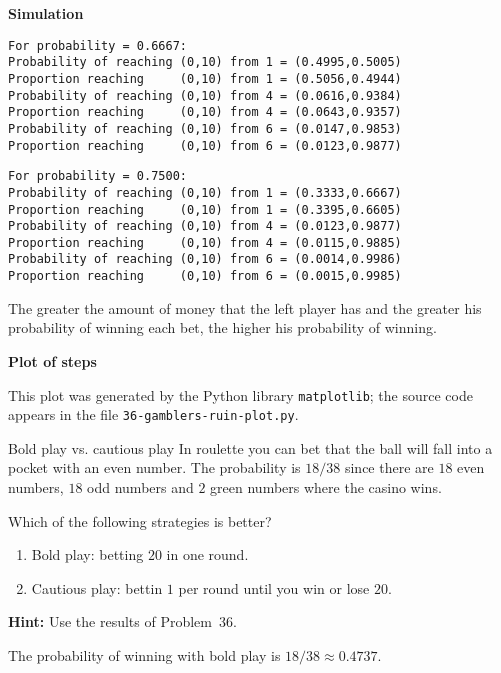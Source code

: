 \textbf{Simulation}
\begin{verbatim}
For probability = 0.6667:
Probability of reaching (0,10) from 1 = (0.4995,0.5005)
Proportion reaching     (0,10) from 1 = (0.5056,0.4944)
Probability of reaching (0,10) from 4 = (0.0616,0.9384)
Proportion reaching     (0,10) from 4 = (0.0643,0.9357)
Probability of reaching (0,10) from 6 = (0.0147,0.9853)
Proportion reaching     (0,10) from 6 = (0.0123,0.9877)
\end{verbatim}

\begin{verbatim}
For probability = 0.7500:
Probability of reaching (0,10) from 1 = (0.3333,0.6667)
Proportion reaching     (0,10) from 1 = (0.3395,0.6605)
Probability of reaching (0,10) from 4 = (0.0123,0.9877)
Proportion reaching     (0,10) from 4 = (0.0115,0.9885)
Probability of reaching (0,10) from 6 = (0.0014,0.9986)
Proportion reaching     (0,10) from 6 = (0.0015,0.9985)
\end{verbatim}
The greater the amount of money that the left player has and the greater his probability of winning each bet, the higher his probability of winning.

\textbf{Plot of steps}

This plot was generated by the Python library \texttt{matplotlib}; the source code appears in the file \texttt{36-gamblers-ruin-plot.py}.
\begin{center}

\end{center}


\begin{prob}{Bold play vs. cautious play}
In roulette you can bet that the ball will fall into a pocket with an even number. The probability is $18/38$ since there are $18$ even numbers, $18$ odd numbers and $2$ green numbers where the casino wins.

Which of the following strategies is better?
\begin{enumerate}
\item Bold play: betting $20$ in one round.
\item Cautious play: bettin $1$ per round until you win or lose $20$.
\end{enumerate}
\textbf{Hint:} Use the results of Problem~36.
\end{prob}

\solution{}

The probability of winning with bold play is $18/38\approx 0.4737$.

